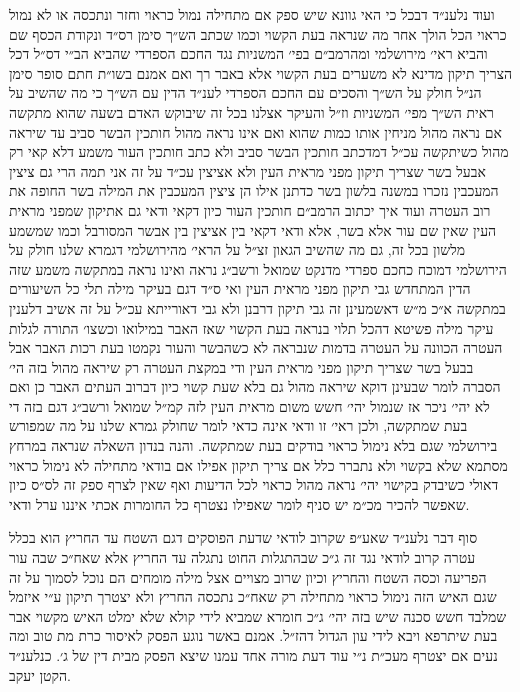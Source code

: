 \documentclass[12pt, openany]{book}
\begin{document}
\begin{multicols}{2}
ועוד נלענ״ד דבכל כי האי גוונא שיש ספק אם מתחילה נמול כראוי וחזר ונתכסה או לא נמול כראוי הכל הולך אחר מה שנראה בעת הקשוי וכמו שכתב הש״ך סימן רס״ד ונקודת הכסף שם והביא ראי׳ מירושלמי ומהרמב״ם בפי׳ המשניות נגד החכם הספרדי שהביא הב״י דס״ל דכל הצריך תיקון מדינא לא משערים בעת הקשוי אלא באבר רך ואם אמנם בשו״ת חתם סופר סימן הנ״ל חולק על הש״ך והסכים עם החכם הספרדי לענ״ד הדין עם הש״ך כי מה שהשיב על ראית הש״ך מפי׳ המשניות וז״ל והעיקר אצלנו בכל זה שיבוקש האדם בשעה שהוא מתקשה אם נראה מהול מניחין אותו כמות שהוא ואם אינו נראה מהול חותכין הבשר סביב עד שיראה מהול כשיתקשה עכ״ל דמדכתב חותכין הבשר סביב ולא כתב חותכין העור משמע דלא קאי רק אבעל בשר שצריך תיקון מפני מראית העין ולא אציצין עכ״ד על זה אני תמה הרי גם ציצין המעכבין נזכרו במשנה בלשון בשר כדתנן אילו הן ציצין המעכבין את המילה בשר החופה את רוב העטרה ועוד איך יכתוב הרמב״ם חותכין העור כיון דקאי ודאי גם אתיקון שמפני מראית העין שאין שם עור אלא בשר, אלא ודאי דקאי בין אציצין בין אבשר המסורבל וכמו שמשמע מלשון בכל זה, גם מה שהשיב הגאון זצ״ל על הראי׳ מהירושלמי דגמרא שלנו חולק על הירושלמי דמוכח כחכם ספרדי מדנקט שמואל ורשב״ג נראה ואינו נראה במתקשה משמע שזה הדין המתחדש גבי תיקון מפני מראית העין ואי ס״ד דגם בעיקר מילה תלי כל השיעורים במתקשה א״כ מ״ש דאשמעינן זה גבי תיקון דרבנן ולא גבי דאורייתא עכ״ל על זה אשיב דלענין עיקר מילה פשיטא דהכל תלוי בנראה בעת הקשוי שאז האבר במילואו וכשצו׳ התורה לגלות העטרה הכוונה על העטרה בדמות שנבראה לא כשהבשר והעור נקמטו בעת רכות האבר אבל בבעל בשר שצריך תיקון מפני מראית העין ודי במקצת העטרה רק שיראה מהול בזה הי׳ הסברה לומר שבעינן דוקא שיראה מהול גם בלא שעת קשוי כיון דברוב העתים האבר כן ואם לא יהי׳ ניכר אז שנמול יהי׳ חשש משום מראית העין לזה קמ״ל שמואל ורשב״ג דגם בזה די בעת שמתקשה, ולכן ראי׳ זו ודאי אינה כדאי לומר שחולק גמרא שלנו על מה שמפורש בירושלמי שגם בלא נימול כראוי בודקים בעת שמתקשה. והנה בנדון השאלה שנראה במרחץ מסתמא שלא בקשוי ולא נתברר כלל אם צריך תיקון אפילו אם בודאי מתחילה לא נימול כראוי דאולי כשיבדק בקישוי יהי׳ נראה מהול כראוי לכל הדיעות ואף שאין לצרף ספק זה לס״ס כיון שאפשר להכיר מכ״מ יש סניף לומר שאפילו נצטרף כל החומרות אכתי איננו ערל ודאי.\\\vspace{0pt}

סוף דבר נלענ״ד שאע״פ שקרוב לודאי שדעת הפוסקים דגם השטח עד החריץ הוא בכלל עטרה קרוב לודאי נגד זה ג״כ שבהתגלות החוט נתגלה עד החריץ אלא שאח״כ שבה עור הפריעה וכסה השטח והחריץ וכיון שרוב מצויים אצל מילה מומחים הם נוכל לסמוך על זה שגם האיש הזה נימול כראוי מתחילה רק שאח״כ נתכסה החריץ ולא יצטרך תיקון ע״י איזמל שמלבד חשש סכנה שיש בזה יהי׳ ג״כ חומרא שמביא לידי קולא שלא ימלט האיש מקשוי אבר בעת שיתרפא ויבא לידי עון הגדול דהז״ל. אמנם באשר נוגע הפסק לאיסור כרת מת טוב ומה נעים אם יצטרף מעכ״ת נ״י עוד דעת מורה אחד עמנו שיצא הפסק מבית דין של ג׳. כנלענ״ד הקטן יעקב.\\\vspace{0pt}

\end{multicols}\newpage
\end{document}
